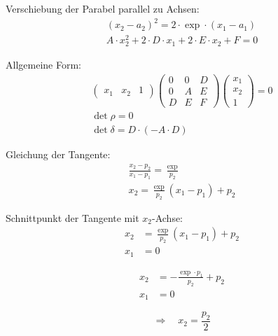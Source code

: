 Verschiebung der Parabel parallel zu Achsen:
\begin{gather}
  {\left({x_2-a_2}\right)}^2 = 2 \cdot \exp \cdot \left({x_1-a_1}\right) \\
  A \cdot x_2^2 + 2 \cdot D \cdot x_1 + 2 \cdot E \cdot x_2 + F = 0
\end{gather}

Allgemeine Form:
\begin{gather}
  \begin{pmatrix}x_1 & x_2 & 1\end{pmatrix}
	\begin{pmatrix}
		0 & 0 & D \\
		0 & A & E \\
		D & E & F
	\end{pmatrix}
	\begin{pmatrix}x_1 \\ x_2 \\ 1 \end{pmatrix} = 0 \\
	\det{\rho} = 0 \\
	\det{\delta} = D\cdot (-A\cdot D)
\end{gather}

Gleichung der Tangente:
\begin{gather}
  \frac{x_2-p_2}{x_1-p_1} = \frac{\exp}{p_2} \\
  x_2 = \frac{\exp}{p_2}(x_1-p_1)+p_2
\end{gather}

Schnittpunkt der Tangente mit $x_2$-Achse:
\begin{align}
  x_2 &= \frac{\exp}{p_2}(x_1-p_1)+p_2 \\
  x_1 &= 0
\end{align}

\begin{align}
  x_2 &= -\frac{\exp\cdot p_1}{p_2}+p_2 \\
  x_1 &= 0
\end{align}

\begin{equation}
  \Rightarrow\quad x_2 = \frac{p_2}{2}
\end{equation}



